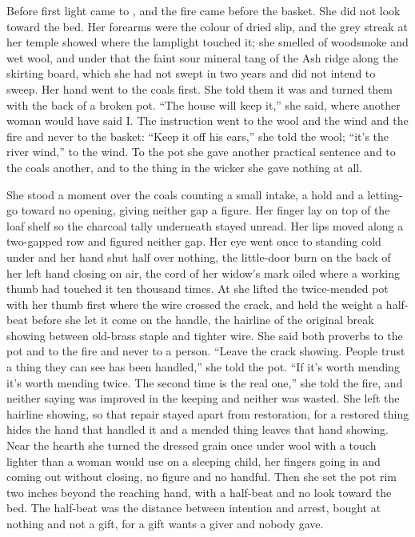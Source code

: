 Before first light  came to , and the fire came before the basket. She did not look toward the bed. Her forearms were the colour of dried slip, and the grey streak at her temple showed where the lamplight touched it; she smelled of woodsmoke and wet wool, and under that the faint sour mineral tang of the Ash ridge along the skirting board, which she had not swept in two years and did not intend to sweep. Her hand went to the coals first. She told them it was  and turned them with the back of a broken pot. “The house will keep it,” she said, where another woman would have said I. The instruction went to the wool and the wind and the fire and never to the basket: “Keep it off his ears,” she told the wool; “it's the river wind,” to the wind. To the pot she gave another practical sentence and to the coals another, and to the thing in the wicker she gave nothing at all.

She stood a moment over the coals counting a small intake, a hold and a letting-go toward no opening, giving neither gap a figure. Her finger lay on top of the loaf shelf so the charcoal tally underneath stayed unread. Her lips moved along a two-gapped row and figured neither gap. Her eye went once to  standing cold under  and her hand shut half over nothing, the little-door burn on the back of her left hand closing on air, the cord of her widow's mark oiled where a working thumb had touched it ten thousand times. At  she lifted the twice-mended pot with her thumb first where the wire crossed the crack, and held the weight a half-beat before she let it come on the handle, the hairline of the original break showing between old-brass staple and tighter wire. She said both proverbs to the pot and to the fire and never to a person. “Leave the crack showing. People trust a thing they can see has been handled,” she told the pot. “If it's worth mending it's worth mending twice. The second time is the real one,” she told the fire, and neither saying was improved in the keeping and neither was wasted. She left the hairline showing, so that repair stayed apart from restoration, for a restored thing hides the hand that handled it and a mended thing leaves that hand showing. Near the hearth she turned the dressed grain once under wool with a touch lighter than a woman would use on a sleeping child, her fingers going in and coming out without closing, no figure and no handful. Then she set the pot rim two inches beyond the reaching hand, with a half-beat and no look toward the bed. The half-beat was the distance between intention and arrest, bought at nothing and not a gift, for a gift wants a giver and nobody gave.

